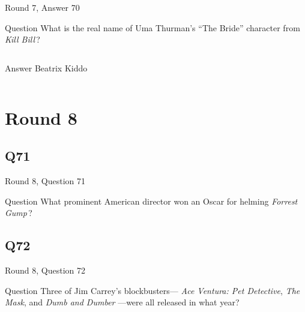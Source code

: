 \documentclass[11pt]{beamer}
\begin{document}
\begin{frame}[t]{Round 7, Answer 70}
\vspace{2em}
\begin{block}{Question}
What is the real name of Uma Thurman's ``The Bride'' character from \emph{Kill Bill}\,?
\end{block}
\pause{}
\begin{columns}[T,totalwidth=\linewidth]
\begin{column}{0.35\linewidth}
\begin{block}{Answer}
Beatrix Kiddo
\end{block}
\end{column}
\begin{column}{0.6\linewidth}
\begin{center}
\texttt{[image: \{Images/uma-thurman-kill-bill]}.jpg}
\end{center}
\end{column}
\end{columns}
\end{frame}
    

\section{Round 8}
    

\subsection*{Q71}
\begin{frame}[t]{Round 8, Question 71}
\vspace{2em}
\begin{block}{Question}
What prominent American director won an Oscar for helming \emph{Forrest Gump}\,?
\end{block}
\end{frame}
    

\subsection*{Q72}
\begin{frame}[t]{Round 8, Question 72}
\vspace{2em}
\begin{block}{Question}
Three of Jim Carrey's blockbusters— \emph{Ace Ventura: Pet Detective}, \emph{The Mask}, and \emph{Dumb and Dumber} —were all released in what year?
\end{block}
\end{frame}
    
\end{document}
